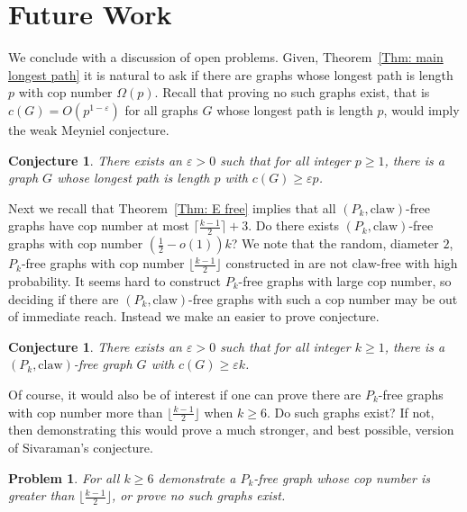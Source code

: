 \documentclass[12pt]{article}
\newtheorem{conjecture}[theorem]{Conjecture}
\newtheorem{problem}[theorem]{Problem}
\theoremstyle{definition}
\def\epsilon{\varepsilon}
\def\claw{\text{claw}}
\begin{document}
\section{Future Work}


We conclude with a discussion of open problems.
Given, Theorem~\ref{Thm: main longest path} it is natural to ask if there are graphs whose longest path is length $p$ with cop number $\Omega(p)$.
Recall that proving no such graphs exist, that is $c(G) = O(p^{1-\epsilon})$ for all graphs $G$ whose longest path is length $p$,
would imply the weak Meyniel conjecture.

\begin{conjecture}\label{Conj: linear lower in path length}
    There exists an $\epsilon>0$ such that 
    for all integer $p\geq 1$, there is a graph $G$ whose longest path is length $p$ with $c(G)\geq \epsilon p$.
\end{conjecture}


Next we recall that
Theorem~\ref{Thm: E free} implies that all $(P_k,\claw)$-free graphs have cop number at most $\lceil \frac{k-1}{2}\rceil+3$.
Do there exists $(P_k,\claw)$-free graphs with cop number $(\frac{1}{2}-o(1))k$?
We note that the random, diameter $2$, $P_k$-free graphs with cop number $\lfloor\frac{k-1}{2}\rfloor$
constructed in \cite{clow2025cops} are not $\claw$-free with high probability.
It seems hard to construct $P_k$-free graphs with large cop number, 
so deciding if there are $(P_k,\claw)$-free graphs with such a cop number may be out of immediate reach.
Instead we make an easier to prove conjecture.

\begin{conjecture}\label{Conj: P_k,claw}
    There exists an $\epsilon>0$ such that 
    for all integer $k\geq 1$, there is a $(P_k,\claw)$-free graph $G$ with $c(G)\geq \epsilon k$.
\end{conjecture}

Of course, it would also be of interest if one can prove there are $P_k$-free graphs with cop number more than 
$\lfloor\frac{k-1}{2}\rfloor$ when $k\geq 6$.
Do such graphs exist?
If not, then demonstrating this would prove a much stronger, and best possible, version of Sivaraman's conjecture.

\begin{problem}\label{Prob: P_k}
    For all $k\geq 6$ demonstrate a $P_k$-free graph whose cop number is greater than $\lfloor\frac{k-1}{2}\rfloor$, or prove no such graphs exist.
\end{problem}



\end{document}
